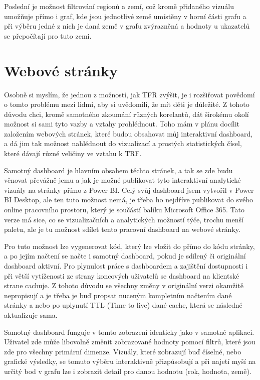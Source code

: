 \documentclass[thesis=M,czech]{FITthesis}[2022/10/08]
\begin{document}
Poslední je možnost filtrování regionů a zemí, což kromě přidaného vizuálu umožňuje přímo i graf, kde jsou jednotlivé země umístěny v horní části grafu a při výběru jedné z nich je daná země v grafu zvýrazněná a hodnoty u ukazatelů se přepočítají pro tuto zemi.

\section{Webové stránky}
Osobně si myslím, že jednou z možností, jak TFR zvýšit, je i rozšiřovat povědomí o tomto problému mezi lidmi, aby si uvědomili, že mít děti je důležité. Z tohoto důvodu chci, kromě samotného zkoumání různých korelantů, dát širokému okolí možnost si sami tyto vazby a vztahy prohlédnout. Toho mám v plánu docílit založením webových stránek, které budou obsahovat můj interaktivní dashboard, a dá jim tak možnost nahlédnout do vizualizací a prostých statistických čísel, které dávají různé veličiny ve vztahu k TRF.

Samotný dashboard je hlavním obsahem těchto stránek, a tak se zde budu věnovat převážně jemu a jak je možné publikovat tyto interaktivní analytické vizuály na stránky přímo z Power BI. Celý svůj dashboard jsem vytvořil v Power BI Desktop, ale ten tuto možnost nemá, je třeba ho nejdříve publikovat do svého online pracovního prostoru, který je součástí balíku Microsoft Office 365. Tato verze má sice, co se vizualizačních a analytických možností týče, trochu menší paletu, ale je tu možnost sdílet tento pracovní dashboard na webové stránky. 

Pro tuto možnost lze vygenerovat kód, který lze vložit do přímo do kódu stránky, a po jejím načtení se načte i samotný dashboard, pokud je sdílený či originální dashboard aktivní. Pro plynulost práce s dashboardem a zajištění dostupnosti i při větší vytíženosti ze strany koncových uživatelů se dashboard na klientské strane cachuje. Z tohoto důvodu se všechny změny v originální verzi okamžitě nepropisují a je třeba je buď propsat nuceným kompletním načtením dané stránky a nebo po uplynutí TTL (Time to live) dané cache, která se následné aktualizuje sama.

Samotný dashboard funguje v tomto zobrazení identicky jako v samotné aplikaci. Uživatel zde může libovolně změnit zobrazované hodnoty pomocí filtrů, které jsou zde pro všechny primární dimenze. Vizuály, které zobrazují buď číselné, nebo grafické výsledky, se tomuto výběru interaktivně přizpůsobují a při najetí myší na určitý bod v grafu lze i zobrazit detail pro danou hodnotu (rok, hodnota, země).
\end{document}
